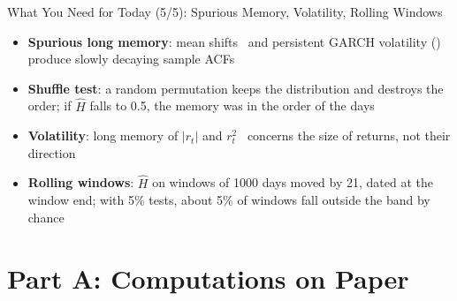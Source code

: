 \begin{frame}{What You Need for Today (5/5): Spurious Memory, Volatility, Rolling Windows}
\itemsize{\small}
\begin{itemize}
    \item \textbf{Spurious long memory}: mean shifts \ and persistent GARCH volatility () produce slowly decaying sample ACFs
    \item \textbf{Shuffle test}: a random permutation keeps the distribution and destroys the order; if $\hat H$ falls to 0.5, the memory was in the order of the days
    \item \textbf{Volatility}: long memory of $|r_t|$ and $r_t^2$ \ concerns the size of returns, not their direction
    \item \textbf{Rolling windows}: $\hat H$ on windows of 1000 days moved by 21, dated at the window end; with 5\% tests, about 5\% of windows fall outside the band by chance
\end{itemize}
\end{frame}


\section{Part A: Computations on Paper}

